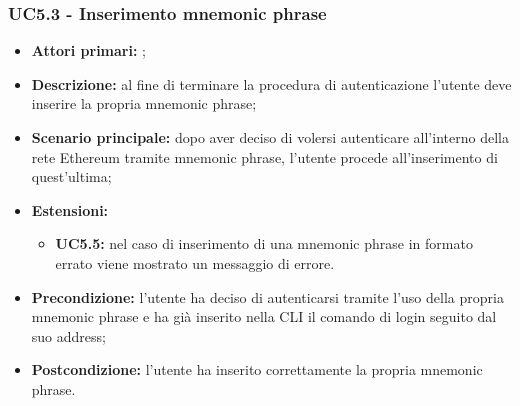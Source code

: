 \subsubsection{UC5.3 - Inserimento mnemonic phrase}
\begin{itemize}
	\item \textbf{Attori primari:} \una{};
	\item \textbf{Descrizione:} al fine di terminare la procedura di autenticazione l’utente deve inserire la propria mnemonic phrase; 
	\item \textbf{Scenario principale:} dopo aver deciso di volersi autenticare all’interno della rete Ethereum tramite mnemonic phrase, l'utente procede all’inserimento di quest’ultima;  
	\item \textbf{Estensioni:} 
	\begin{itemize}
		\item \textbf{UC5.5:} nel caso di inserimento di una mnemonic phrase in formato errato viene mostrato un messaggio di errore. 
	\end{itemize}
	\item \textbf{Precondizione:} l’utente ha deciso di autenticarsi tramite l’uso della propria mnemonic phrase e ha già inserito nella CLI il comando di login seguito dal suo address;
	\item \textbf{Postcondizione:} l’utente ha inserito correttamente la propria mnemonic phrase. 
\end{itemize}
